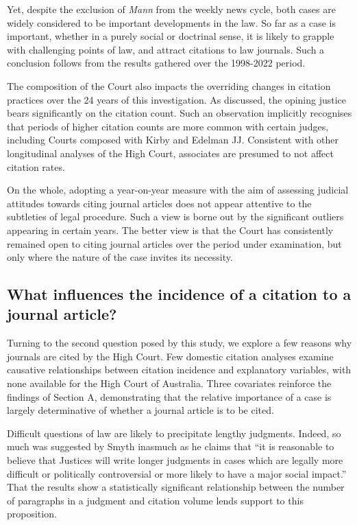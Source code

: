 Yet, despite the exclusion of \textit{Mann} from the weekly news cycle, both cases are widely considered to be important developments in the law. So far as a case is important, whether in a purely social or doctrinal sense, it is likely to grapple with challenging points of law, and attract citations to law journals. Such a conclusion follows from the results gathered over the 1998-2022 period.

The composition of the Court also impacts the overriding changes in citation practices over the 24 years of this investigation. As discussed, the opining justice bears significantly on the citation count. Such an observation implicitly recognises that periods of higher citation counts are more common with certain judges, including Courts composed with Kirby and Edelman JJ. Consistent with other longitudinal analyses of the High Court, associates are presumed to not affect citation rates.

On the whole, adopting a year-on-year measure with the aim of assessing judicial attitudes towards citing journal articles does not appear attentive to the subtleties of legal procedure. Such a view is borne out by the significant outliers appearing in certain years. The better view is that the Court has consistently remained open to citing journal articles over the period under examination, but only where the nature of the case invites its necessity.

\subsection{What influences the incidence of a citation to a journal article?}

Turning to the second question posed by this study, we explore a few reasons why journals are cited by the High Court. Few domestic citation analyses examine causative relationships between citation incidence and explanatory variables, with none available for the High Court of Australia. Three covariates reinforce the findings of Section A, demonstrating that the relative importance of a case is largely determinative of whether a journal article is to be cited.

Difficult questions of law are likely to precipitate lengthy judgments. Indeed, so much was suggested by Smyth inasmuch as he claims that ``it is reasonable to believe that Justices will write longer judgments in cases which are legally more difficult or politically controversial or more likely to have a major social impact.'' That the results show a statistically significant relationship between the number of paragraphs in a judgment and citation volume lends support to this proposition.

